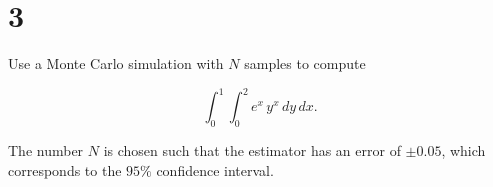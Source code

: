 \section{3}

Use a Monte Carlo simulation with $N$ samples to compute

\begin{equation}
	\int_{0}^{1} \int_{0}^{2} e^{x}\,y^{x}\,dy\,dx.
\end{equation}

The number $N$ is chosen such that the estimator has an error of $\pm 0.05$, which corresponds to the $95\%$ confidence interval.

